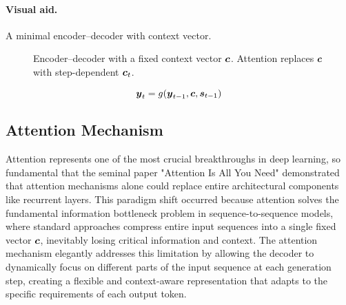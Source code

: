 \paragraph{Visual aid.} A minimal encoder–decoder with context vector.
\begin{figure}[h]
    \centering
    \caption{Encoder–decoder with a fixed context vector $\boldsymbol{c}$. Attention replaces $\boldsymbol{c}$ with step-dependent $\boldsymbol{c}_t$.}
\end{figure}

\begin{equation}
\boldsymbol{y}_t = g(\boldsymbol{y}_{t-1}, \boldsymbol{c}, \boldsymbol{s}_{t-1})
\end{equation}

\subsection{Attention Mechanism}

Attention represents one of the most crucial breakthroughs in deep learning, so fundamental that the seminal paper "Attention Is All You Need" \cite{Vaswani2017} demonstrated that attention mechanisms alone could replace entire architectural components like recurrent layers. This paradigm shift occurred because attention solves the fundamental information bottleneck problem in sequence-to-sequence models, where standard approaches compress entire input sequences into a single fixed vector $\boldsymbol{c}$, inevitably losing critical information and context. The attention mechanism elegantly addresses this limitation by allowing the decoder to dynamically focus on different parts of the input sequence at each generation step, creating a flexible and context-aware representation that adapts to the specific requirements of each output token.

